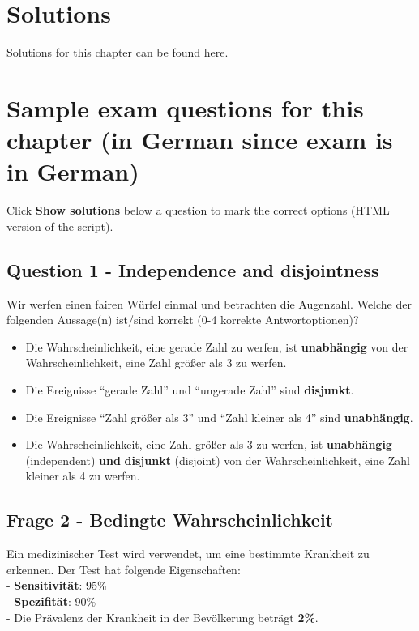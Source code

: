 \documentclass[
]{book}
\begin{document}
\section{Solutions}\label{solutions}

Solutions for this chapter can be found \href{https://github.com/jdegenfellner/Script_QM1_ZHAW/tree/main/Solutions_to_Exercises/2_Probability}{here}.

\section{Sample exam questions for this chapter (in German since exam is in German)}\label{sample-exam-questions-for-this-chapter-in-german-since-exam-is-in-german}

Click \textbf{Show solutions} below a question to mark the correct options (HTML version of the script).

\subsection{Question 1 - Independence and disjointness}\label{question-1---independence-and-disjointness}

Wir werfen einen fairen Würfel einmal und betrachten die Augenzahl. Welche der folgenden Aussage(n) ist/sind korrekt (0-4 korrekte Antwortoptionen)?

\begin{itemize}
\item
  Die Wahrscheinlichkeit, eine gerade Zahl zu werfen, ist \textbf{unabhängig} von der Wahrscheinlichkeit, eine Zahl größer als 3 zu werfen.
\item
  Die Ereignisse ``gerade Zahl'' und ``ungerade Zahl'' sind \textbf{disjunkt}.
\item
  Die Ereignisse ``Zahl größer als 3'' und ``Zahl kleiner als 4'' sind \textbf{unabhängig}.
\item
  Die Wahrscheinlichkeit, eine Zahl größer als 3 zu werfen, ist \textbf{unabhängig} (independent) \textbf{und}
  \textbf{disjunkt} (disjoint) von der Wahrscheinlichkeit, eine Zahl kleiner als 4 zu werfen.
\end{itemize}

\subsection{Frage 2 - Bedingte Wahrscheinlichkeit}\label{frage-2---bedingte-wahrscheinlichkeit}

Ein medizinischer Test wird verwendet, um eine bestimmte Krankheit zu erkennen. Der Test hat folgende Eigenschaften:\\
- \textbf{Sensitivität}: 95\%\\
- \textbf{Spezifität}: 90\%\\
- Die Prävalenz der Krankheit in der Bevölkerung beträgt \textbf{2\%}.
\end{document}
